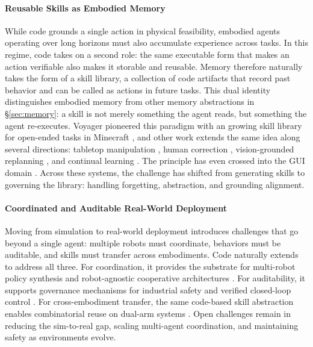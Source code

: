 \paragraph{Reusable Skills as Embodied Memory} While code grounds a single action in physical feasibility, embodied agents operating over long horizons must also accumulate experience across tasks. In this regime, code takes on a second role: the same executable form that makes an action verifiable also makes it storable and reusable. 
Memory therefore naturally takes the form of a skill library, a collection of code artifacts that record past behavior and can be called as actions in future tasks.
This dual identity distinguishes embodied memory from other memory abstractions in \S\ref{sec:memory}: a skill is not merely something the agent reads, but something the agent re-executes. Voyager pioneered this paradigm with an growing skill library for open-ended tasks in Minecraft \citep{wang2023voyager}, and other work extends the same idea along several directions: tabletop manipulation \citep{tziafas2024lifelong}, human correction \citep{meng2025growing}, vision-grounded replanning \citep{kagaya2025vireskill}, and continual learning \citep{wang2026lifelong}. The principle has even crossed into the GUI domain \citep{lin2026uivoyagerselfevolvingguiagent}. Across these systems, the challenge has shifted from generating skills to governing the library: handling forgetting, abstraction, and grounding alignment.

\paragraph{Coordinated and Auditable Real-World Deployment} Moving from simulation to real-world deployment introduces challenges that go beyond a single agent: multiple robots must coordinate, behaviors must be auditable, and skills must transfer across embodiments. Code naturally extends to address all three. For coordination, it provides the substrate for multi-robot policy synthesis \citep{ji2026genswarm} and robot-agnostic cooperative architectures \citep{ashley2026racas}. For auditability, it supports governance mechanisms for industrial safety \citep{guan2025normcode, liu2026agents4plc} and verified closed-loop control \citep{santos2026alrm}. For cross-embodiment transfer, the same code-based skill abstraction enables combinatorial reuse on dual-arm systems \citep{zhai2026skillvla}. Open challenges remain in reducing the sim-to-real gap, scaling multi-agent coordination, and maintaining safety as environments evolve.




